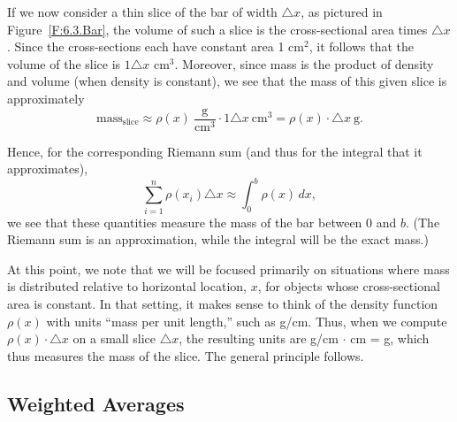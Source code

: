 If we now consider a thin slice of the bar of width $\triangle x$, as pictured in Figure~\ref{F:6.3.Bar}, the volume of such a slice is the cross-sectional area times $\triangle x$.  Since the cross-sections each have constant area 1 cm$^2$, it follows that the volume of the slice is $1 \triangle x$ cm$^3$.  Moreover, since mass is the product of density and volume (when density is constant), we see that the mass of this given slice is approximately
$$\mbox{mass}_{\mbox{slice}} \approx \rho(x) \ \frac{\mbox{g}}{\mbox{cm}^3} \cdot 1 \triangle x \ \mbox{cm}^3 = \rho(x) \cdot \triangle x \ \mbox{g}.$$

Hence, for the corresponding Riemann sum (and thus for the integral that it approximates),
$$\sum_{i=1}^n \rho(x_i) \triangle x \approx \int_0^b \rho(x) \, dx,$$
we see that these quantities measure the mass of the bar between $0$ and $b$.   (The Riemann sum is an approximation, while the integral will be the exact mass.)

At this point, we note that we will be focused primarily on situations where mass is distributed relative to horizontal location, $x$, for objects whose cross-sectional area is constant.  In that setting, it makes sense to think of the density function $\rho(x)$ with units ``mass per unit length,'' such as g/cm.  Thus, when we compute $\rho(x) \cdot \triangle x$ on a small slice $\triangle x$, the resulting units are g/cm $\cdot$ cm = g, which thus measures the mass of the slice.  The general principle follows.

\vspace*{5pt}
\nin {}
\vspace*{1pt}



\subsection*{Weighted Averages}

